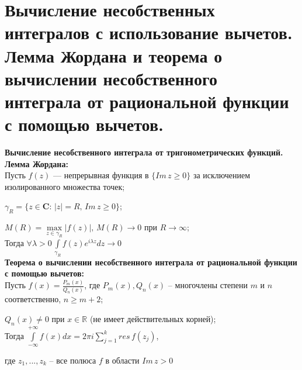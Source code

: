 \newpage 
\section{Вычисление несобственных интегралов с использование вычетов. Лемма Жордана и теорема о вычислении несобственного интеграла от рациональной функции с помощью вычетов.}

\textbf{Вычисление несобственного интеграла от тригонометрических функций.}\\[2mm]



\textbf{Лемма Жордана:}\\[2mm]
Пусть  $f(z)$ --- непрерывная функция в $\{Im\,z \geq 0\}$ за исключением изолированного множества точек;

$\gamma_{R} =\{z\in\mathbf{C}: \, |z|=R, \, Im\,z\geq 0\}$;

$M(R)=\underset{z\in \gamma_{R}}{\max}|f(z)|, \, M(R) \rightarrow 0$ при $R\rightarrow \infty$;\\[2mm]
Тогда $\forall \lambda > 0 \, \int\limits_{\gamma_{R}} f(z)e^{i\lambda z}dz\rightarrow 0$\\[4mm]

\textbf{Теорема о вычислении несобственного интеграла от рациональной функции с помощью вычетов:}\\[2mm]
Пусть  $f(x)=\frac{P_m(x)}{Q_n(x)}$, где $P_m(x), Q_n(x)$ -- многочлены степени $m$ и $n$ соответственно, $n\geq m+2$;

$Q_n(x)\neq 0$ при $x \in \mathbb{R}$ (не имеет действительных корней);\\[2mm]
Тогда $\int\limits_{-\infty}^{+\infty}f(x)dx=2\pi i \sum_{j=1}^k res\,f(z_j)$, 

где $z_1, ...,z_k$ -- все полюса $f$ в области $Im\,z >0$\\[2mm]

